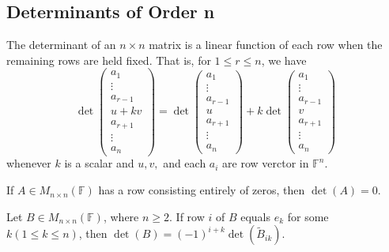 \subsection{Determinants of Order n}
\begin{theorem}
    The determinant of an \( n \times n \) matrix is a linear function of each row when the remaining rows are held fixed. That is, for \( 1 \leq r \leq n \), we have
    \[
    \det
    \begin{pmatrix}
        a_1 \\
        \vdots \\
        a_{r-1} \\
        u + kv \\
        a_{r+1} \\
        \vdots \\
        a_n
    \end{pmatrix}
    =
    \det
    \begin{pmatrix}
        a_1 \\
        \vdots \\
        a_{r-1} \\
        u \\
        a_{r+1} \\
        \vdots \\
        a_n
    \end{pmatrix}
    + k
    \det
    \begin{pmatrix}
        a_1 \\
        \vdots \\
        a_{r-1} \\
        v \\
        a_{r+1} \\
        \vdots \\
        a_n
    \end{pmatrix}
    \]
    whenever \(k \) is a scalar and \(u, v,\) and each \(a_i\) are row verctor in \(\mathbb{F}^n\).
\end{theorem}
\vspace{12cm}
\begin{corollary}
    If \(A \in M_{n \times n}(\mathbb{F})\) has a row consisting entirely of zeros, then \(\det (A) = 0\).
\end{corollary}
\newpage
\begin{lemma}
    Let \(B \in M_{n \times n}(\mathbb{F})\), where \( n \geq 2 \). If row \(i\) of \(B\) equals \(e_k\) for some \(k (1\leq k \leq n)\), then \(\det (B) = (-1)^{i+k} \det (\tilde{B}_{ik})\).
\end{lemma}

